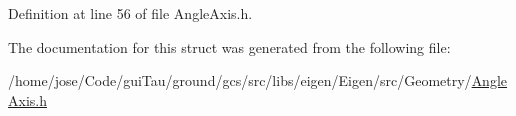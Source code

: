 Definition at line 56 of file Angle\-Axis.\-h.



The documentation for this struct was generated from the following file\-:\begin{DoxyCompactItemize}
\item 
/home/jose/\-Code/gui\-Tau/ground/gcs/src/libs/eigen/\-Eigen/src/\-Geometry/\hyperlink{_angle_axis_8h}{Angle\-Axis.\-h}\end{DoxyCompactItemize}
